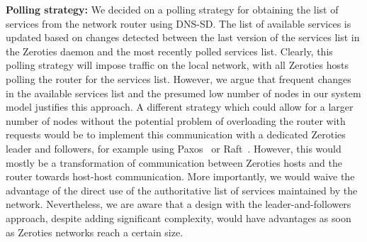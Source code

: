\textbf{Polling strategy:}
We decided on a polling strategy for obtaining the list of services from the network router using DNS-SD.
The list of available services is updated based on changes detected between the last version of the services list in the Zeroties daemon and the most recently polled services list.
Clearly, this polling strategy will impose traffic on the local network, with all Zeroties hosts polling the router for the services list.
However, we argue that frequent changes in the available services list and the presumed low number of nodes in our system model justifies this approach.
A different strategy which could allow for a larger number of nodes without the potential problem of overloading the router with requests would be to implement this communication with a dedicated Zeroties leader and followers, for example using Paxos~\cite{lamport_2001} or Raft~\cite{ongaro_2014}.
However, this would mostly be a transformation of communication between Zeroties hosts and the router towards host-host communication. 
More importantly, we would waive the advantage of the direct use of the authoritative list of services maintained by the network.
Nevertheless, we are aware that a design with the leader-and-followers approach, despite adding significant complexity, would have advantages as soon as Zeroties networks reach a certain size.



